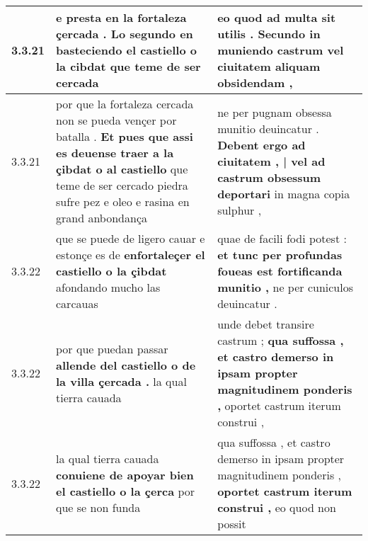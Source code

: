 \begin{tabular}{|p{1cm}|p{6.5cm}|p{6.5cm}|}
3.3.21 & e presta en la fortaleza çercada . \textbf{ Lo segundo en basteciendo el castiello o la cibdat } que teme de ser cercada & eo quod ad multa sit utilis . \textbf{ Secundo in muniendo castrum } vel ciuitatem aliquam obsidendam , \\\hline
3.3.21 & por que la fortaleza cercada non se pueda vençer por batalla . \textbf{ Et pues que assi es deuense traer a la çibdat o al castiello } que teme de ser cercado piedra sufre pez e oleo e rasina en grand anbondança & ne per pugnam obsessa munitio deuincatur . \textbf{ Debent ergo ad ciuitatem , | vel ad castrum obsessum deportari } in magna copia sulphur , \\\hline
3.3.22 & que se puede de ligero cauar e estonçe es de \textbf{ enfortaleçer el castiello o la çibdat } afondando mucho las carcauas & quae de facili fodi potest : \textbf{ et tunc per profundas foueas est fortificanda munitio , } ne per cuniculos deuincatur . \\\hline
3.3.22 & por que puedan passar \textbf{ allende del castiello o de la villa çercada . } la qual tierra cauada & unde debet transire castrum ; \textbf{ qua suffossa , et castro demerso in ipsam propter magnitudinem ponderis , } oportet castrum iterum construi , \\\hline
3.3.22 & la qual tierra cauada \textbf{ conuiene de apoyar bien el castiello o la çerca } por que se non funda & qua suffossa , et castro demerso in ipsam propter magnitudinem ponderis , \textbf{ oportet castrum iterum construi , } eo quod non possit \\\hline

\end{tabular}
